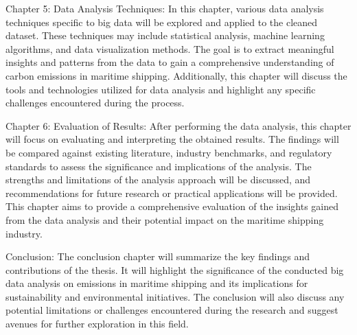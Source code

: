 \noindent Chapter 5: Data Analysis Techniques:
In this chapter, various data analysis techniques specific to big data will be explored and applied to the cleaned dataset.
These techniques may include statistical analysis, machine learning algorithms, and data visualization methods.
The goal is to extract meaningful insights and patterns from the data to gain a comprehensive understanding of carbon emissions in maritime shipping.
Additionally, this chapter will discuss the tools and technologies utilized for data analysis and highlight any specific challenges encountered during the process.

\noindent Chapter 6: Evaluation of Results:
After performing the data analysis, this chapter will focus on evaluating and interpreting the obtained results.
The findings will be compared against existing literature, industry benchmarks, and regulatory standards to assess the significance and implications of the analysis.
The strengths and limitations of the analysis approach will be discussed, and recommendations for future research or practical applications will be provided.
This chapter aims to provide a comprehensive evaluation of the insights gained from the data analysis and their potential impact on the maritime shipping industry.

\noindent Conclusion:
The conclusion chapter will summarize the key findings and contributions of the thesis.
It will highlight the significance of the conducted big data analysis on emissions in maritime shipping and its implications for sustainability and environmental initiatives.
The conclusion will also discuss any potential limitations or challenges encountered during the research and suggest avenues for further exploration in this field.